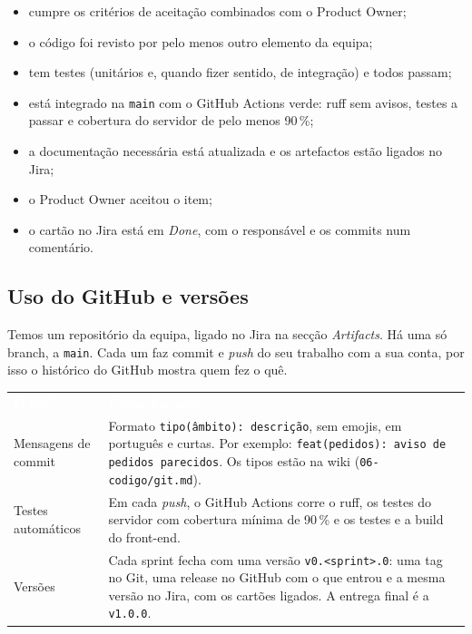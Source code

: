 \documentclass[11pt,a4paper]{article}
\newcommand{\th}[1]{\textcolor{white}{\sffamily\bfseries #1}}
\begin{document}
\begin{tcolorbox}[caixa, title={Definição de Concluído}, colback=azulclaro!40]
  \begin{itemize}[label=\textcolor{azul}{$\square$}]
    \item cumpre os critérios de aceitação combinados com o Product Owner;
    \item o código foi revisto por pelo menos outro elemento da equipa;
    \item tem testes (unitários e, quando fizer sentido, de integração) e todos passam;
    \item está integrado na \texttt{main} com o GitHub Actions verde: ruff sem avisos, testes a passar e cobertura do servidor de pelo menos 90\,\%;
    \item a documentação necessária está atualizada e os artefactos estão ligados no Jira;
    \item o Product Owner aceitou o item;
    \item o cartão no Jira está em \textit{Done}, com o responsável e os commits num comentário.
  \end{itemize}
\end{tcolorbox}

\subsection{Uso do GitHub e versões}

Temos um repositório da equipa, ligado no Jira na secção \textit{Artifacts}. Há uma só branch, a \texttt{main}. Cada um faz commit e \textit{push} do seu trabalho com a sua conta, por isso o histórico do GitHub mostra quem fez o quê.

\small
\renewcommand{\arraystretch}{1.5}
\begin{tabularx}{\textwidth}{N{4.9cm} Y}
   \th{O quê} & \th{Como fazemos} \\
   Mensagens de commit & Formato \texttt{tipo(âmbito): descrição}, sem emojis, em português e curtas. Por exemplo: \texttt{feat(pedidos): aviso de pedidos parecidos}. Os tipos estão na wiki (\texttt{06-codigo/git.md}). \\
   Testes automáticos & Em cada \textit{push}, o GitHub Actions corre o ruff, os testes do servidor com cobertura mínima de 90\,\% e os testes e a build do front-end. \\
   Versões & Cada sprint fecha com uma versão \texttt{v0.<sprint>.0}: uma tag no Git, uma release no GitHub com o que entrou e a mesma versão no Jira, com os cartões ligados. A entrega final é a \texttt{v1.0.0}. \\
  \bottomrule
\end{tabularx}
\renewcommand{\arraystretch}{1}
\normalsize
\end{document}
